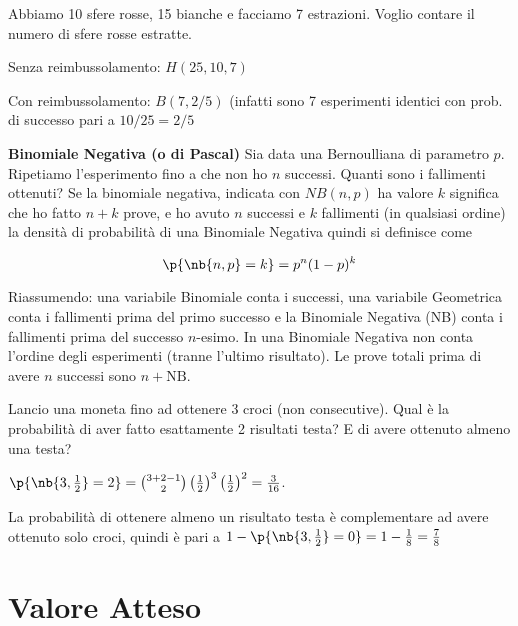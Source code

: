 \begin{exmp}
    Abbiamo 10 sfere rosse, 15 bianche e facciamo 7 estrazioni. Voglio contare
    il numero di sfere rosse estratte.

    Senza reimbussolamento: $H(25,10,7)$
    
    Con reimbussolamento: $B(7,2/5)$ (infatti sono 7 esperimenti identici con
    prob. di successo pari a $10/25=2/5$
\end{exmp}

\begin{defn}
    \textbf{Binomiale Negativa (o di Pascal)}
    Sia data una Bernoulliana di parametro $ p $. Ripetiamo l'esperimento fino a
	che non ho $ n $ successi. Quanti sono i fallimenti ottenuti? Se la
	binomiale negativa, indicata con $NB(n,p)$  ha valore $k$ significa che ho
	fatto $n+k$ prove, e ho avuto $ n $ successi e $ k $ fallimenti (in
	qualsiasi ordine)  la densit\`a di probabilit\`a  di una Binomiale Negativa
	quindi si definisce come

    \begin{equation*}
    \p{\nb{n, p} = k} = p^n(1-p)^k
    \end{equation*}
\end{defn}

Riassumendo: una variabile Binomiale conta i successi, una variabile Geometrica
conta i fallimenti prima del primo successo e la Binomiale Negativa (NB) conta i
fallimenti prima del successo $ n $-esimo. In una Binomiale Negativa non conta
l'ordine degli esperimenti (tranne l'ultimo risultato). Le prove totali prima di
avere $ n $ successi sono $ n+\text{NB} $.

\begin{exmp}
	Lancio una moneta fino ad ottenere 3 croci (non consecutive). Qual \`e la
	probabilit\`a  di aver fatto esattamente 2 risultati testa? E di avere
	ottenuto almeno una testa?

    $ \p{\nb{3, \frac{1}{2}} = 2} = \binom{3+2-1}{2} \left(\frac{1}{2}\right)^3
    \left(\frac{1}{2}\right)^2 = \frac{3}{16} $.

	La probabilit\`a  di ottenere almeno un risultato testa \`e complementare ad
	avere ottenuto solo croci, quindi \`e pari a $1- \p{\nb{3, \frac{1}{2}} = 0}
	= 1 - \frac{1}{8} = \frac{7}{8} $
\end{exmp}

\section{Valore Atteso}

